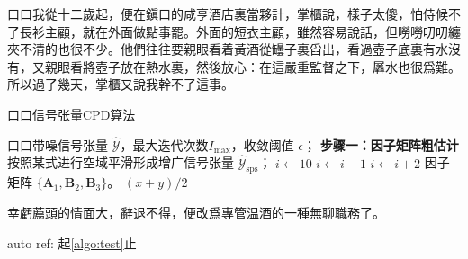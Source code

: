 \documentclass[type=bachelor]{bithesis}
\begin{document}
\frontmatter
\mainmatter

口口我從十二歲起，便在鎭口的咸亨酒店裏當夥計，掌櫃說，樣子太傻，怕侍候不了長衫主顧，就在外面做點事罷。外面的短衣主顧，雖然容易說話，但嘮嘮叨叨纏夾不清的也很不少。他們往往要親眼看着黃酒從罎子裏舀出，看過壺子底裏有水沒有，又親眼看將壺子放在熱水裏，然後放心：在這嚴重監督之下，羼水也很爲難。所以過了幾天，掌櫃又說我幹不了這事。

\begin{algorithm}[H]
  \caption{口口信号张量CPD算法} \label{algo:test}
  \begin{algorithmic}[1]
    \REQUIRE 口口带噪信号张量 $\hat{\mathcal{Y}}$，最大迭代次数$I_{\textrm{max}}$，收敛阈值 $\epsilon$；
    \STATE \textbf{步骤一：因子矩阵粗估计}
    \STATE 按照某式进行空域平滑形成增广信号张量 $\hat{\mathcal{Y}}_{\textrm{sps}}$；
    \STATE $i\gets 10$
    \STATE $i\gets i-1$
    \ELSE
    \STATE $i\gets i+2$
    \ENDIF
    \ENDIF
    \ENSURE 因子矩阵 $\{ \mathbf{A}_1, \mathbf{B}_2, \mathbf{B}_3 \}$。
    \RETURN $(x+y)/2$
  \end{algorithmic}
\end{algorithm}

幸虧薦頭的情面大，辭退不得，便改爲專管温酒的一種無聊職務了。

auto ref: 起\autoref{algo:test}止
\end{document}
